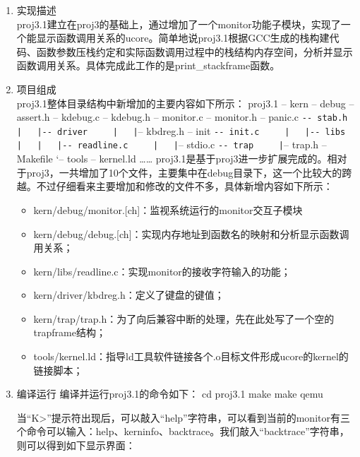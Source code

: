 \begin{enumerate}
\def\labelenumi{\arabic{enumi}.}
\item
  实现描述\\
  proj3.1建立在proj3的基础上，通过增加了一个monitor功能子模块，实现了一个能显示函数调用关系的ucore。简单地说proj3.1根据GCC生成的栈构建代码、函数参数压栈约定和实际函数调用过程中的栈结构内存空间，分析并显示函数调用关系。具体完成此工作的是print\_stackframe函数。
\item
  项目组成\\
  proj3.1整体目录结构中新增加的主要内容如下所示： proj3.1 \textbar{}--
  kern \textbar{} \textbar{}-- debug \textbar{} \textbar{} \textbar{}--
  assert.h \textbar{} \textbar{} \textbar{}-- kdebug.c \textbar{}
  \textbar{} \textbar{}-- kdebug.h \textbar{} \textbar{} \textbar{}--
  monitor.c \textbar{} \textbar{} \textbar{}-- monitor.h \textbar{}
  \textbar{} \textbar{}-- panic.c \textbar{} \textbar{}
  \lstinline!-- stab.h     |   |-- driver     |   |!-- kbdreg.h
  \textbar{} \textbar{}-- init \textbar{} \textbar{}
  \lstinline!-- init.c     |   |-- libs     |   |   |-- readline.c     |   |!--
  stdio.c \textbar{} \lstinline!-- trap     |!-- trap.h \textbar{}--
  Makefile `-- tools \textbar{}-- kernel.ld \ldots{}\ldots{}
  proj3.1是基于proj3进一步扩展完成的。相对于proj3，一共增加了10个文件，主要集中在debug目录下，这一个比较大的跨越。不过仔细看来主要增加和修改的文件不多，具体新增内容如下所示：

  \begin{itemize}
  \tightlist
  \item
    kern/debug/monitor.{[}ch{]}：监视系统运行的monitor交互子模块
  \item
    kern/debug/debug.{[}ch{]}：实现内存地址到函数名的映射和分析显示函数调用关系；
  \item
    kern/libs/readline.c：实现monitor的接收字符输入的功能；
  \item
    kern/driver/kbdreg.h：定义了键盘的键值；
  \item
    kern/trap/trap.h：为了向后兼容中断的处理，先在此处写了一个空的trapframe结构；
  \item
    tools/kernel.ld：指导ld工具软件链接各个.o目标文件形成ucore的kernel的链接脚本；
  \end{itemize}
\item
  编译运行 编译并运行proj3.1的命令如下： cd proj3.1 make make qemu

  当``K\textgreater{}''提示符出现后，可以敲入``help''字符串，可以看到当前的monitor有三个命令可以输入：help、kerninfo、backtrace。我们敲入``backtrace''字符串，则可以得到如下显示界面：


\end{enumerate}
